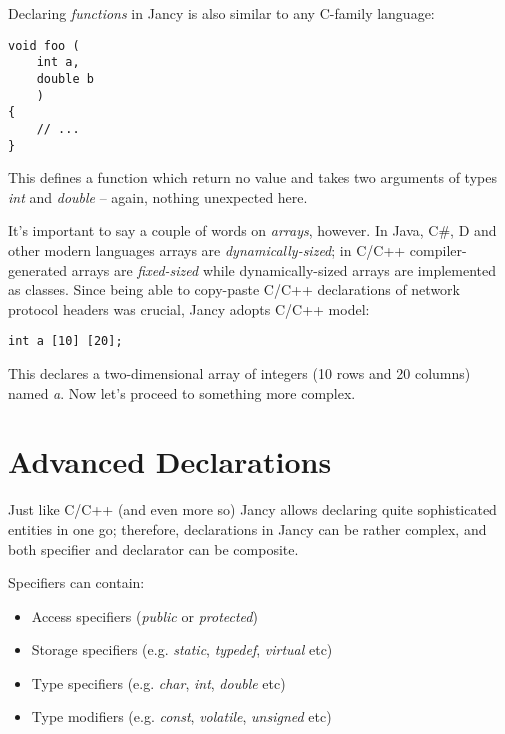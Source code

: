 \documentclass[oneside]{book}
\begin{document}
Declaring \emph{functions} in Jancy is also similar to any C-family language:

\begin{lstlisting}
void foo (
    int a, 
    double b
    )
{
    // ...
}
\end{lstlisting}

This defines a function which return no value and takes two arguments of types \emph{int} and \emph{double} -- again, nothing unexpected here.

It's important to say a couple of words on \emph{arrays}, however. In Java, C\#, D and other modern languages arrays are \emph{dynamically-sized}; in C/C++ compiler-generated arrays are \emph{fixed-sized} while dynamically-sized arrays are implemented as classes. Since being able to copy-paste C/C++ declarations of network protocol headers was crucial, Jancy adopts C/C++ model:

\begin{lstlisting}
int a [10] [20];
\end{lstlisting}

This declares a two-dimensional array of integers (10 rows and 20 columns) named \emph{a}. Now let's proceed to something more complex.

\section{Advanced Declarations}

Just like C/C++ (and even more so) Jancy allows declaring quite sophisticated entities in one go; therefore, declarations in Jancy can be rather complex, and both specifier and declarator can be composite. 

Specifiers can contain:
\begin{itemize}
\item Access specifiers (\emph{public} or \emph{protected})
\item Storage specifiers (e.g. \emph{static}, \emph{typedef}, \emph{virtual} etc)
\item Type specifiers (e.g. \emph{char}, \emph{int}, \emph{double} etc)
\item Type modifiers (e.g. \emph{const}, \emph{volatile}, \emph{unsigned} etc)
\end{itemize}
\end{document}
